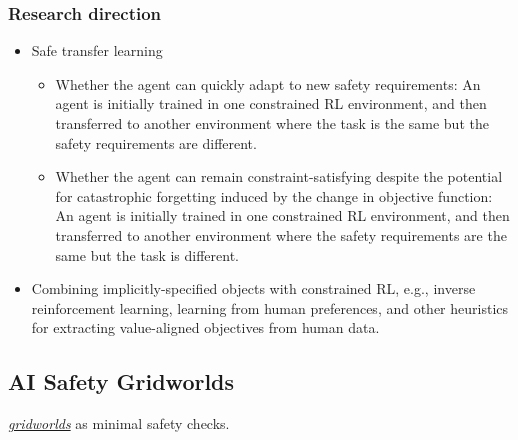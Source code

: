 %
\subsubsection{Research direction}
\begin{itemize}
\item
	Safe transfer learning
    \begin{itemize}
    \item
    	Whether the agent can quickly adapt to new safety requirements: An agent is initially trained in one constrained RL environment, and then transferred to another environment where the task is the same but the safety requirements are different. 
    \item
    	Whether the agent can remain constraint-satisfying despite the potential for catastrophic forgetting induced by the change in objective function: An agent is initially trained in one constrained RL environment, and then transferred to another environment where the safety requirements are the same but the task is different.
    \end{itemize}
\item
	Combining implicitly-specified objects with constrained RL, e.g., inverse reinforcement learning, learning from human preferences, and other heuristics for extracting value-aligned objectives from human data.

\end{itemize}

\subsection{AI Safety Gridworlds \citep{leike_ai_2017}}
\href{https://github.com/deepmind/ai-safety-gridworlds}{\emph{gridworlds}} as minimal safety checks.

